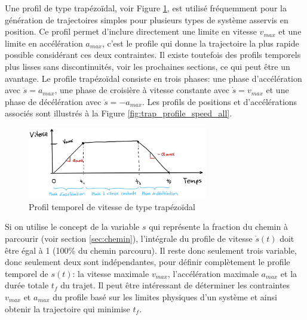 Une profil de type trapézoïdal, voir Figure \ref{fig:trap_profile_speed}, est utilisé fréquemment pour la génération de trajectoires simples pour plusieurs types de système asservis en position. Ce profil permet d'inclure directement une limite en vitesse $v_{max}$ et une limite en accélération $a_{max}$, c'est le profile qui donne la trajectoire la plus rapide possible considérant ces deux contraintes. Il existe toutefois des profils temporels plus lisses sans discontinuités, voir les prochaines sections, ce qui peut être un avantage. Le profile trapézoïdal consiste en trois phases: une phase d'accélération avec $\ddot{s} = a_{max}$, une phase de croisière à vitesse constante avec $\dot{s} = v_{max}$ et une phase de décélération avec $\ddot{s} = -a_{max}$. Les profils de positions et d'accélérations associés sont illustrés à la Figure \ref{fig:trap_profile_speed_all}. 
\begin{figure}[htbp]
	\centering
		\includegraphics[width=0.70\textwidth]{fig/trap_profile_speed.jpg}
	\caption{Profil temporel de vitesse de type trapézoïdal}
	\label{fig:trap_profile_speed}
\end{figure}

Si on utilise le concept de la variable $s$ qui représente la fraction du chemin à parcourir (voir section \ref{sec:chemin}), l'intégrale du profile de vitesse $\dot{s}(t)$ doit être égal à 1 (100\% du chemin parcouru). Il reste donc seulement trois variable, donc seulement deux sont indépendantes, pour définir complètement le profile temporel de $s(t)$: la vitesse maximale $v_{max}$, l'accélération maximale $a_{max}$ et la durée totale $t_f$ du trajet. Il peut être intéressant de déterminer les contraintes $v_{max}$ et $a_{max}$ du profile basé sur les limites physiques d'un système et ainsi obtenir la trajectoire qui minimise $t_f$. 

